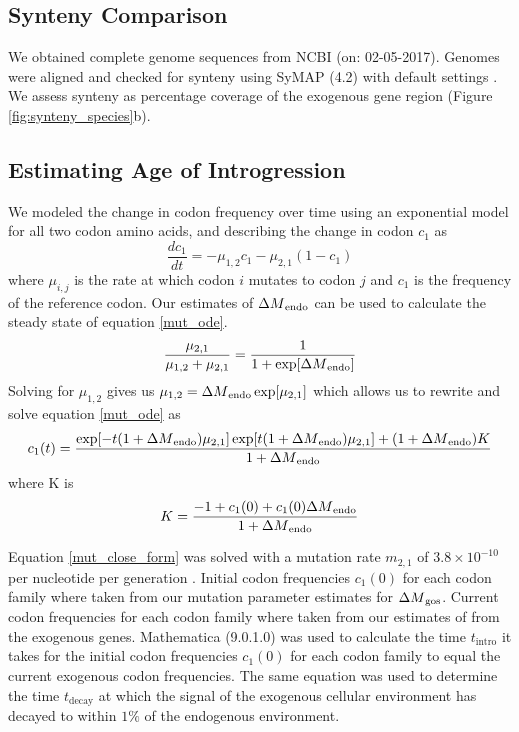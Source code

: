 \subsection{Synteny Comparison}
We obtained complete genome sequences from NCBI (on: 02-05-2017).
Genomes were aligned and checked for synteny using SyMAP (4.2) with default settings \citep{soderlund2006, soderlund2011}.
We assess synteny as percentage coverage of the exogenous gene region (Figure \ref{fig:synteny_species}b).

\subsection{Estimating Age of Introgression}
We modeled the change in codon frequency over time using an exponential model for all two codon amino acids, and describing the change in codon $c_1$ as
\begin{equation}
\frac{d c_1}{d t} = -\mu_{1,2}c_1 - \mu_{2,1}(1-c_1)
\label{mut_ode}
\end{equation}
where $\mu_{i,j}$ is the rate at which codon $i$ mutates to codon $j$ and $c_1$ is the frequency of the reference codon.
Our estimates of ${\Delta M}_\text{endo}$ can be used to calculate the steady state of equation \ref{mut_ode}.
\begin{equation}
\frac{\mu_{2,1}}{\mu_{1,2} + \mu_{2,1}} = \frac{1}{1+\exp[{\Delta M}_\text{endo}]}
\end{equation}
Solving for $\mu_{1,2}$ gives us $\mu_{1,2} = {\Delta M}_\text{endo}\exp[\mu_{2,1}]$ which allows us to rewrite and solve equation \ref{mut_ode} as
\begin{equation}
c_1(t) = \frac{\exp[-t(1+{\Delta M}_\text{endo})\mu_{2,1}]\exp[t(1+{\Delta M}_\text{endo})\mu_{2,1}] + (1+{\Delta M}_\text{endo})K}{1+{\Delta M}_\text{endo}}
\label{mut_close_form}
\end{equation}
where K is
\begin{equation}
K = \frac{-1 + c_1(0) + c_1(0){\Delta M}_\text{endo}}{1+{\Delta M}_\text{endo}}
\end{equation}

Equation \ref{mut_close_form} was solved with a mutation rate $m_{2,1}$ of $3.8\times 10^{-10}$ per nucleotide per generation \citep{lang2008}. 
Initial codon frequencies $c_1(0)$ for each codon family where taken from our mutation parameter estimates for \gossypii ${\Delta M}_\text{gos}$. 
Current codon frequencies for each codon family where taken from our estimates of \DM from the exogenous genes.
Mathematica (9.0.1.0) \citep{Mathematica} was used to calculate the time $t_\text{intro}$ it takes for the initial codon frequencies $c_1(0)$ for each codon family to equal the current exogenous codon frequencies.
The same equation was used to determine the time $t_\text{decay}$ at which the signal of the exogenous cellular environment has decayed to within $1 \%$ of the endogenous environment.

